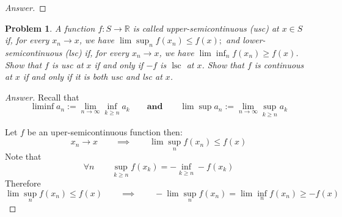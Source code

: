 \documentclass{article}
\newtheorem{problem}{Problem}
\newcommand{\qiq}{\qquad \implies \qquad}
\newcommand{\qaq}{\qquad \textbf{and} \qquad}
\begin{document}
\begin{proof}[Answer]
    
\end{proof}

\begin{problem}
    A function $f: S \rightarrow \mathbb{R}$ is called upper-semicontinuous (usc) at $x \in S$ if, for every $x_{n} \rightarrow x$, we have $\lim \sup _{n} f\left(x_{n}\right) \leq f(x) ;$ and lower-semicontinuous (lsc) if, for every $x_{n} \rightarrow x$, we have $\lim \inf _{n} f\left(x_{n}\right) \geq f(x)$. Show that $f$ is usc at $x$ if and only if $-f$ is $\operatorname{lsc}$ at $x$. Show that $f$ is continuous at $x$ if and only if it is both usc and lsc at $x$. 
\end{problem}

\begin{proof}[Answer]
    Recall that
    $$\liminf a_{n}:=\lim _{n \rightarrow \infty} \inf _{k \geq n} a_{k} \qaq \lim \sup a_{n}:=\lim _{n \rightarrow \infty} \sup _{k \geq n} a_{k}$$

    Let $f$ be an uper-semicontinuous function then:
    $$x_n \to x \qiq   \lim \sup _{n} f\left(x_{n}\right) \leq f(x)$$
    Note that  $$\forall n \qquad  \sup_{k\geq n} f(x_k) = -\inf_{k\geq n} -f(x_k) $$
    Therefore
    $$\lim \sup _{n} f\left(x_{n}\right) \leq f(x) \qiq -\lim \sup _{n} f\left(x_{n}\right)= \lim \inf _{n} f\left(x_{n}\right)\geq -f(x)$$
    
\end{proof}
\end{document}
